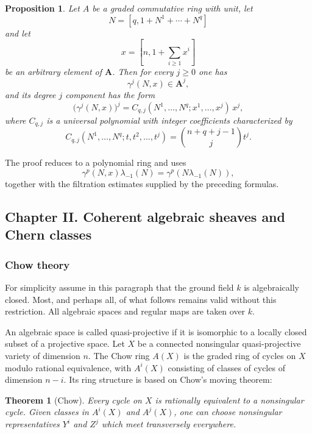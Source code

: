 \documentclass[11pt]{article}
\theoremstyle{plain}
\newtheorem*{theorem*}{Theorem}
\newtheorem*{proposition*}{Proposition}
\theoremstyle{definition}
\theoremstyle{remark}
\begin{document}
\begin{proposition*}
Let $A$ be a graded commutative ring with unit, let
\[
   N=[q,1+N^1+\cdots+N^q]
\]
and let
\[
   x=[n,1+\sum_{i\geq1}x^i]
\]
be an arbitrary element of $\mathbf A$. Then for every $j\geq0$ one has
\[
   \gamma^j(N,x)\in\mathbf A^j,
\]
and its degree $j$ component has the form
\begin{equation}\label{eq:Cqj}
   \bigl(\gamma^j(N,x)\bigr)^j
   =C_{q,j}(N^1,\ldots,N^q;x^1,\ldots,x^j)\,x^j,
\end{equation}
where $C_{q,j}$ is a universal polynomial with integer coefficients characterized by
\begin{equation}\label{eq:Cchar}
   C_{q,j}(N^1,\ldots,N^q;t,t^2,\ldots,t^j)
   =\binom{n+q+j-1}{j}t^j.
\end{equation}
\end{proposition*}

The proof reduces to a polynomial ring and uses
\[
   \gamma^p(N,x)\lambda_{-1}(N)=\gamma^p(N\lambda_{-1}(N)),
\]
together with the filtration estimates supplied by the preceding formulas.

\subsection{Chapter II. Coherent algebraic sheaves and Chern classes}

\subsubsection{Chow theory}

For simplicity assume in this paragraph that the ground field $k$ is algebraically closed. Most, and perhaps all, of what follows remains valid without this restriction. All algebraic spaces and regular maps are taken over $k$.

An algebraic space is called quasi-projective if it is isomorphic to a locally closed subset of a projective space. Let $X$ be a connected nonsingular quasi-projective variety of dimension $n$. The Chow ring $A(X)$ is the graded ring of cycles on $X$ modulo rational equivalence, with $A^i(X)$ consisting of classes of cycles of dimension $n-i$. Its ring structure is based on Chow's moving theorem:

\begin{theorem*}[Chow]
Every cycle on $X$ is rationally equivalent to a nonsingular cycle. Given classes in $A^i(X)$ and $A^j(X)$, one can choose nonsingular representatives $Y^i$ and $Z^j$ which meet transversely everywhere.
\end{theorem*}
\end{document}

